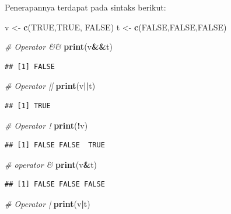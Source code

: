 \documentclass[12pt,]{krantz}
\newenvironment{Shaded}{\begin{snugshade}}{\end{snugshade}}
\newcommand{\CommentTok}[1]{\textcolor[rgb]{0.56,0.35,0.01}{\textit{#1}}}
\newcommand{\KeywordTok}[1]{\textcolor[rgb]{0.13,0.29,0.53}{\textbf{#1}}}
\newcommand{\NormalTok}[1]{#1}
\newcommand{\OperatorTok}[1]{\textcolor[rgb]{0.81,0.36,0.00}{\textbf{#1}}}
\newcommand{\OtherTok}[1]{\textcolor[rgb]{0.56,0.35,0.01}{#1}}
\newcommand{\StringTok}[1]{\textcolor[rgb]{0.31,0.60,0.02}{#1}}
\begin{document}
Penerapannya terdapat pada sintaks berikut:

\begin{Shaded}
\begin{Highlighting}[]
\NormalTok{v <-}\StringTok{ }\KeywordTok{c}\NormalTok{(}\OtherTok{TRUE}\NormalTok{,}\OtherTok{TRUE}\NormalTok{, }\OtherTok{FALSE}\NormalTok{)}
\NormalTok{t <-}\StringTok{ }\KeywordTok{c}\NormalTok{(}\OtherTok{FALSE}\NormalTok{,}\OtherTok{FALSE}\NormalTok{,}\OtherTok{FALSE}\NormalTok{)}

\CommentTok{# Operator &&}
\KeywordTok{print}\NormalTok{(v}\OperatorTok{&&}\NormalTok{t)}
\end{Highlighting}
\end{Shaded}

\begin{verbatim}
## [1] FALSE
\end{verbatim}

\begin{Shaded}
\begin{Highlighting}[]
\CommentTok{# Operator ||}
\KeywordTok{print}\NormalTok{(v}\OperatorTok{||}\NormalTok{t)}
\end{Highlighting}
\end{Shaded}

\begin{verbatim}
## [1] TRUE
\end{verbatim}

\begin{Shaded}
\begin{Highlighting}[]
\CommentTok{# Operator !}
\KeywordTok{print}\NormalTok{(}\OperatorTok{!}\NormalTok{v)}
\end{Highlighting}
\end{Shaded}

\begin{verbatim}
## [1] FALSE FALSE  TRUE
\end{verbatim}

\begin{Shaded}
\begin{Highlighting}[]
\CommentTok{# operator &}
\KeywordTok{print}\NormalTok{(v}\OperatorTok{&}\NormalTok{t)}
\end{Highlighting}
\end{Shaded}

\begin{verbatim}
## [1] FALSE FALSE FALSE
\end{verbatim}

\begin{Shaded}
\begin{Highlighting}[]
\CommentTok{# Operator |}
\KeywordTok{print}\NormalTok{(v}\OperatorTok{|}\NormalTok{t)}
\end{Highlighting}
\end{Shaded}
\end{document}
